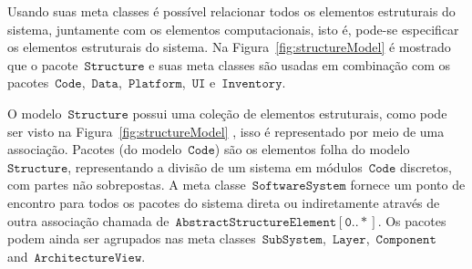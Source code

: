  Usando suas meta classes é possível relacionar todos os elementos estruturais do sistema, juntamente com os elementos computacionais, isto é, pode-se especificar os elementos estruturais do sistema. Na Figura~\ref{fig:structureModel} é mostrado que o pacote~$\mathtt{Structure}$ e suas meta classes são usadas em combinação com os pacotes~$\mathtt{Code}$,~$\mathtt{Data}$,~$\mathtt{Platform}$,~$\mathtt{UI}$ e~$\mathtt{Inventory}$. 


O modelo~$\mathtt{Structure}$ possui uma coleção de elementos estruturais, como pode ser visto na Figura~\ref{fig:structureModel} , isso é representado por meio de uma associação. Pacotes (do modelo~$\mathtt{Code}$) são os elementos folha do modelo~$\mathtt{Structure}$, representando a divisão de um sistema em módulos~$\mathtt{Code}$ discretos, com partes não sobrepostas. A meta classe~$\mathtt{SoftwareSystem}$ fornece um ponto de encontro para todos os pacotes do sistema direta ou indiretamente através de outra associação chamada de~$\mathtt{AbstractStructureElement[0..*]}$. Os pacotes podem ainda ser agrupados nas meta classes~$\mathtt{SubSystem}$,~$\mathtt{Layer}$,~$\mathtt{Component}$ and~$\mathtt{ArchitectureView}$.


